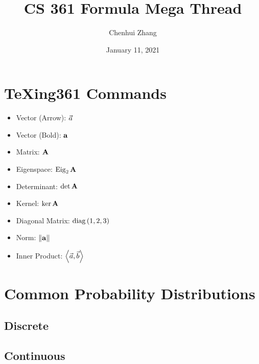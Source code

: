\documentclass{article}
\title{CS 361 Formula Mega Thread}
\author{Chenhui Zhang}
\date{January 11, 2021}
\begin{document}
\maketitle

\section{TeXing361 Commands}
\begin{itemize}
    \item Vector (Arrow): $\vec{a}$
    \item Vector (Bold): $\mathbf{a}$
    \item Matrix: $\mathbf{A}$
    \item Eigenspace: $\operatorname{Eig}_{2}\mathbf{A}$
    \item Determinant: $\det\mathbf{A}$
    \item Kernel: $\ker\mathbf{A}$
    \item Diagonal Matrix: $\operatorname{diag}{(1, 2, 3)}$
    \item Norm: $\left\|\mathbf{a}\right\|$
    \item Inner Product: $\left\langle\vec{a},\vec{b}\right\rangle$
\end{itemize}

\section{Common Probability Distributions}
    \subsection{Discrete}


\subsection{Continuous}
\end{document}
